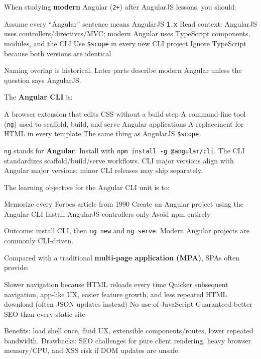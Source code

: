 \question[4]
When studying \textbf{modern} Angular (\texttt{2+}) after AngularJS lessons, you should:
\begin{choices}
  \choice Assume every ``Angular'' sentence means AngularJS \texttt{1.x}
  \CorrectChoice Read context: AngularJS uses controllers/directives/MVC; modern Angular uses TypeScript components, modules, and the CLI
  \choice Use \texttt{\$scope} in every new CLI project
  \choice Ignore TypeScript because both versions are identical
\end{choices}
\begin{solution}
  Naming overlap is historical. Later parts describe modern Angular unless the question says AngularJS.
\end{solution}

\question[4]
The \textbf{Angular CLI} is:
\begin{choices}
  \choice A browser extension that edits CSS without a build step
  \CorrectChoice A command-line tool (\texttt{ng}) used to scaffold, build, and serve Angular applications
  \choice A replacement for HTML in every template
  \choice The same thing as AngularJS \texttt{\$scope}
\end{choices}
\begin{solution}
  \lstinline[style=bashinline]{ng} stands for \textbf{Angular}. Install with \lstinline[style=bashinline]{npm install -g @angular/cli}. The CLI standardizes scaffold/build/serve workflows. CLI major versions align with Angular major versions; minor CLI releases may ship separately.
\end{solution}

\question[4]
The learning objective for the Angular CLI unit is to:
\begin{choices}
  \choice Memorize every Forbes article from 1990
  \CorrectChoice Create an Angular project using the Angular CLI
  \choice Install AngularJS controllers only
  \choice Avoid npm entirely
\end{choices}
\begin{solution}
  Outcome: install CLI, then \lstinline[style=bashinline]{ng new} and \lstinline[style=bashinline]{ng serve}. Modern Angular projects are commonly CLI-driven.
\end{solution}

\question[4]
Compared with a traditional \textbf{multi-page application (MPA)}, SPAs often provide:
\begin{choices}
  \choice Slower navigation because HTML reloads every time
  \CorrectChoice Quicker subsequent navigation, app-like UX, easier feature growth, and less repeated HTML download (often JSON updates instead)
  \choice No use of JavaScript
  \choice Guaranteed better SEO than every static site
\end{choices}
\begin{solution}
  Benefits: load shell once, fluid UX, extensible components/routes, lower repeated bandwidth. Drawbacks: SEO challenges for pure client rendering, heavy browser memory/CPU, and XSS risk if DOM updates are unsafe.
\end{solution}


